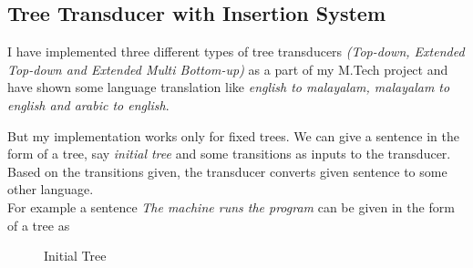 \subsection{Tree Transducer with Insertion System}

I have implemented three different types of tree transducers \emph{(Top-down, Extended Top-down and 
Extended Multi Bottom-up)} as a part of my M.Tech project and have shown some language translation like
 \emph{english to malayalam, malayalam to english and arabic to english}.

But my implementation works only for fixed trees. We can give a sentence in the form of a tree, say \emph{initial tree} and some 
transitions as inputs to the transducer. Based on the transitions given, the transducer converts given sentence to some other
language.\\For example a sentence \emph{The machine runs the program} can be given in the form of a tree as
\begin{figure}[h]
\begin{center}
{\tiny
{}
{
	{
		{
		}
		{
		}
	}
	{
		{
		}					
		{
			{
			}
			{
			}
		}
	}
}
\label{fig2}
\caption{Initial Tree}
}
\end{center}
\end{figure}

